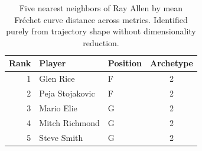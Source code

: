 \begin{table}[htbp]
  \centering\small
  \begin{tabular}{rllc}
    \toprule
    Rank & Player & Position & Archetype \\
    \midrule
    1 & Glen Rice & F & 2 \\
    2 & Peja Stojakovic & F & 2 \\
    3 & Mario Elie & G & 2 \\
    4 & Mitch Richmond & G & 2 \\
    5 & Steve Smith & G & 2 \\
    \bottomrule
  \end{tabular}
  \caption{Five nearest neighbors of Ray Allen by mean Fr\'{e}chet curve distance across metrics. Identified purely from trajectory shape without dimensionality reduction.}
  \label{tab:Ray_Allen_frechet_curve_neighbors}
\end{table}

